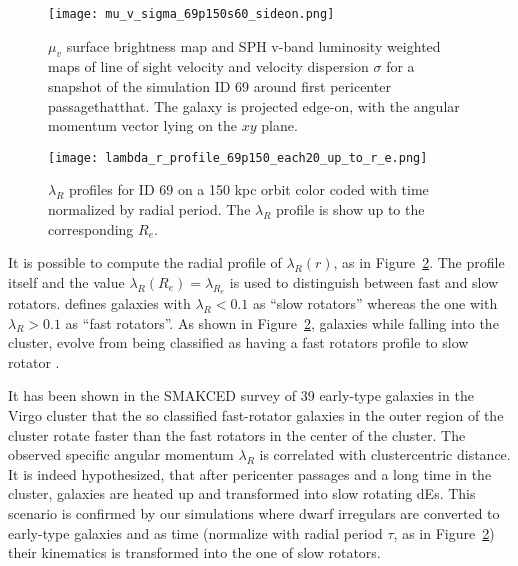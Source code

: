 \begin{figure}
\centering
\texttt{[image: mu\_v\_sigma\_69p150s60\_sideon.png]}
\caption{$\mu_v$ surface brightness map and SPH v-band luminosity weighted maps of line of sight velocity and velocity dispersion $\sigma$ for a snapshot of the simulation ID 69 around first pericenter passagethatthat.
The galaxy is projected edge-on, with the angular momentum vector lying on the $xy$ plane.}
\label{fig:maps_lambda_r}
\end{figure}

\begin{figure}
\centering
\texttt{[image: lambda\_r\_profile\_69p150\_each20\_up\_to\_r\_e.png]}
\caption{$\lambda_R$ profiles for ID 69 on a 150 kpc orbit color coded with time normalized by radial period. The $\lambda_R$ profile is show up to the corresponding $R_e$.}
\label{fig:lambda_r_profile}
\end{figure}

It is possible to compute the radial profile of $\lambda_R(r)$, as in Figure~\ref{fig:lambda_r_profile}.
The profile itself and the value $\lambda_R(R_e) = \lambda_{R_e}$ is used to distinguish between fast and slow rotators.
\citet{Emsellem2007} defines galaxies with $\lambda_R < 0.1$ as ``slow rotators'' whereas the one with $\lambda_R>0.1$ as ``fast rotators''.
As shown in Figure~\ref{fig:lambda_r_profile}, galaxies while falling into the cluster, evolve from being classified as having a fast rotators profile to slow rotator \citep[cf.][]{Emsellem2011}.


It has been shown in the \textsc{SMAKCED} survey of 39 early-type galaxies in the Virgo cluster \citep{Toloba2014, Toloba2015} that the so classified fast-rotator galaxies in the outer region of the cluster rotate faster than the fast rotators in the center of the cluster.
The observed specific angular momentum $\lambda_R$ is correlated with clustercentric distance. %
It is indeed hypothesized, that after pericenter passages and a long time in the cluster, galaxies are heated up and transformed into slow rotating dEs.
This scenario is confirmed by our simulations where dwarf irregulars are converted to early-type galaxies and as time (normalize with radial period $\tau$, as in Figure~\ref{fig:lambda_r_profile}) their kinematics is transformed into the one of slow rotators.


